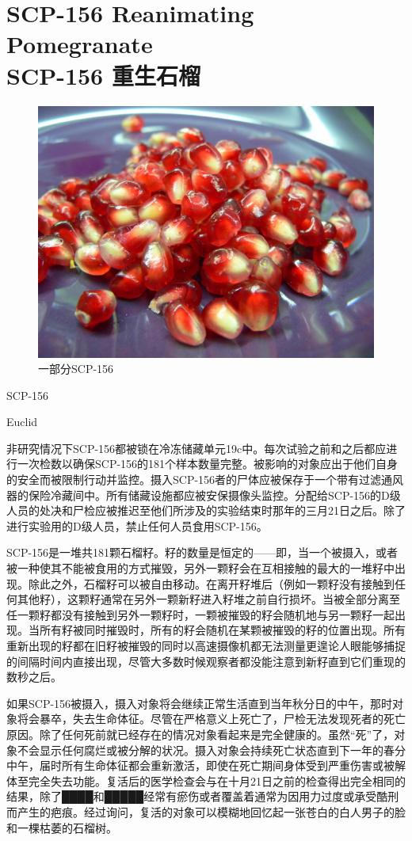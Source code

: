 \chapter[SCP-156 重生石榴]{
    SCP-156 Reanimating Pomegranate \\
    SCP-156 重生石榴
}

\label{chap:SCP-156}

\begin{figure}[H]
    \centering
    \includegraphics[width=0.5\linewidth]{images/SCP.156.jpg}
    \caption*{一部分SCP-156}
\end{figure}

SCP-156

Euclid

非研究情况下SCP-156都被锁在冷冻储藏单元19c中。每次试验之前和之后都应进行一次检数以确保SCP-156的181个样本数量完整。被影响的对象应出于他们自身的安全而被限制行动并监控。摄入SCP-156者的尸体应被保存于一个带有过滤通风器的保险冷藏间中。所有储藏设施都应被安保摄像头监控。分配给SCP-156的D级人员的处决和尸检应被推迟至他们所涉及的实验结束时那年的三月21日之后。除了进行实验用的D级人员，禁止任何人员食用SCP-156。

SCP-156是一堆共181颗石榴籽。籽的数量是恒定的——即，当一个被摄入，或者被一种使其不能被食用的方式摧毁，另外一颗籽会在互相接触的最大的一堆籽中出现。除此之外，石榴籽可以被自由移动。在离开籽堆后（例如一颗籽没有接触到任何其他籽），这颗籽通常在另外一颗新籽进入籽堆之前自行损坏。当被全部分离至任一颗籽都没有接触到另外一颗籽时，一颗被摧毁的籽会随机地与另一颗籽一起出现。当所有籽被同时摧毁时，所有的籽会随机在某颗被摧毁的籽的位置出现。所有重新出现的籽都在旧籽被摧毁的同时以高速摄像机都无法测量更遑论人眼能够捕捉的间隔时间内直接出现，尽管大多数时候观察者都没能注意到新籽直到它们重现的数秒之后。

如果SCP-156被摄入，摄入对象将会继续正常生活直到当年秋分日的中午，那时对象将会暴卒，失去生命体征。尽管在严格意义上死亡了，尸检无法发现死者的死亡原因。除了任何死前就已经存在的情况对象看起来是完全健康的。虽然“死”了，对象不会显示任何腐烂或被分解的状况。摄入对象会持续死亡状态直到下一年的春分中午，届时所有生命体征都会重新激活，即使在死亡期间身体受到严重伤害或被解体至完全失去功能。复活后的医学检查会与在十月21日之前的检查得出完全相同的结果，除了████和█████经常有瘀伤或者覆盖着通常为因用力过度或承受酷刑而产生的疤痕。经过询问，复活的对象可以模糊地回忆起一张苍白的白人男子的脸和一棵枯萎的石榴树。

